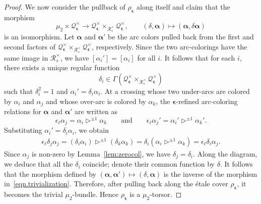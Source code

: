 \documentclass[12pt,reqno]{amsart}
\newcommand{\calQ}{\mathcal{Q}}
\newcommand{\calR}{\mathcal{R}}
\theoremstyle{definition}
\begin{document}
\begin{proof}
		We now consider the pullback of $\rho_{\boldsymbol{\epsilon}}$ along itself and claim that the morphism
		\begin{equation} \label{eqn.trivialization}
			\mu_2\times \calQ_{\boldsymbol{\epsilon}}^\times
			\longrightarrow
			\calQ_{\boldsymbol{\epsilon}}^\times \times_{\calR_s^\times}\calQ_{\boldsymbol{\epsilon}}^\times, \qquad 
            (\delta,\boldsymbol{\alpha}) \mapsto (\boldsymbol{\alpha},\delta\boldsymbol{\alpha})
		\end{equation}
		is an isomorphism. Let $\boldsymbol{\alpha}$ and $\boldsymbol{\alpha}'$ be the arc colors pulled back from the first and second factors of $\calQ_{\boldsymbol{\epsilon}}^\times \times_{\calR_s^\times}
		\calQ_{\boldsymbol{\epsilon}}^\times$, respectively. Since the two arc-colorings have the same
		image in $\calR_s^\times$, we have $[\alpha_i']=[\alpha_i]$ for all $i$. It follows that for each $i$, there exists a unique regular function
		\[
		\delta_i\in\Gamma \left( \calQ_{\boldsymbol{\epsilon}}^\times \times_{\calR_s^\times} \calQ_{\boldsymbol{\epsilon}}^\times \right)
		\]
		such that $\delta_i^2=1$ and $\alpha_i'=\delta_i\alpha_i$.
		At a crossing whose two under-arcs are colored by $\alpha_i$ and $\alpha_j$ and whose over-arc is colored by $\alpha_k$,  the $\boldsymbol{\epsilon}$-refined arc-coloring relations for $\boldsymbol{\alpha}$ and $\boldsymbol{\alpha}'$ are written as
		\[
		\epsilon_\ell\alpha_j =	\alpha_i\triangleright^{\pm1}\alpha_k \qquad \text{and}	\qquad
		\epsilon_\ell\alpha_j' =	\alpha_i'\triangleright^{\pm1}\alpha_k'.
		\]
		Substituting $\alpha_i'=\delta_i\alpha_i$, we obtain
		\begin{align*}
			\epsilon_\ell\delta_j\alpha_j =	(\delta_i\alpha_i)	\triangleright^{\pm1} (\delta_k\alpha_k) 
            = \delta_i (\alpha_i\triangleright^{\pm1}\alpha_k) = \epsilon_\ell\delta_i\alpha_j.
		\end{align*}
		Since $\alpha_j$ is non-zero by Lemma~\ref{lem:zerocol}, we have $\delta_j = \delta_i$. Along the diagram, we deduce that all the $\delta_i$ coincide; denote their common function by $\delta$. It follows that the morphism defined by $(\boldsymbol{\alpha}, \boldsymbol{\alpha}') \mapsto (\delta, \boldsymbol{\alpha})$ is the inverse of the morphism in~\eqref{eqn.trivialization}. Therefore, after pulling back along the étale
		cover $	\rho_{\boldsymbol{\epsilon}}$, it becomes the trivial $\mu_2$-bundle. Hence $\rho_{\boldsymbol{\epsilon}}$ is a $\mu_2$-torsor.
	\end{proof}
	
\end{document}
